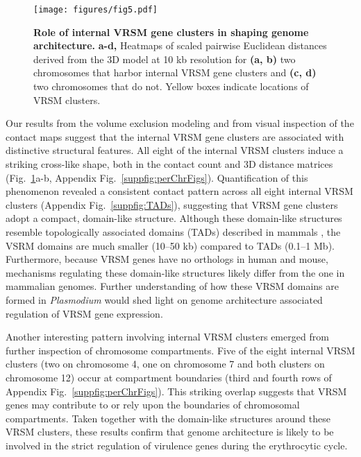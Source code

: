   \begin{figure}[h]
\texttt{[image: figures/fig5.pdf]}
  \centering
  \caption{{\bf Role of internal VRSM gene clusters in shaping genome
  architecture.}
   \textbf{a-d,} Heatmaps of scaled pairwise Euclidean distances derived from
   the 3D model at 10 kb resolution for \textbf{(a, b)} two chromosomes that
   harbor internal VRSM gene clusters and \textbf{(c, d)} two chromosomes that
   do not. Yellow boxes indicate locations of VRSM clusters. }
   \label{fig:fig5}
   \end{figure}



Our results from the volume exclusion modeling and from visual inspection of
the contact maps suggest that the internal VRSM gene clusters are associated
with distinctive structural features. All eight of the internal VRSM clusters
induce a striking cross-like shape, both in the contact count and 3D distance
matrices (Fig.~\ref{fig:fig5}a-b, Appendix
Fig.~\ref{suppfig:perChrFigs}). Quantification of this phenomenon revealed a
consistent contact pattern across all eight internal VRSM clusters
(Appendix Fig.~\ref{suppfig:TADs}), suggesting that VRSM gene clusters
adopt a compact, domain-like structure. Although these domain-like structures
resemble topologically associated domains (TADs) described in mammals
\citep{dixon:topological, nora:spatial}, the VSRM domains are much smaller
(10--50 kb) compared to TADs (0.1--1 Mb). Furthermore, because VRSM genes have
no orthologs in human and mouse, mechanisms regulating these domain-like
structures likely differ from the one in mammalian genomes. Further
understanding of how these VRSM domains are formed in  \emph{Plasmodium} would
shed light on genome architecture associated regulation of VRSM gene
expression.

Another interesting pattern involving internal VRSM clusters emerged from
further inspection of chromosome compartments.  Five of the eight internal
VRSM clusters (two on chromosome 4, one on chromosome 7 and both clusters on
chromosome 12) occur at compartment boundaries (third and fourth rows of
Appendix Fig.~\ref{suppfig:perChrFigs}). This striking overlap  suggests
that VRSM genes may contribute to or rely upon the boundaries of chromosomal
compartments. Taken together with the domain-like structures around these VRSM
clusters, these results confirm that genome architecture is likely to be
involved in the strict regulation of virulence genes during the erythrocytic
cycle.

